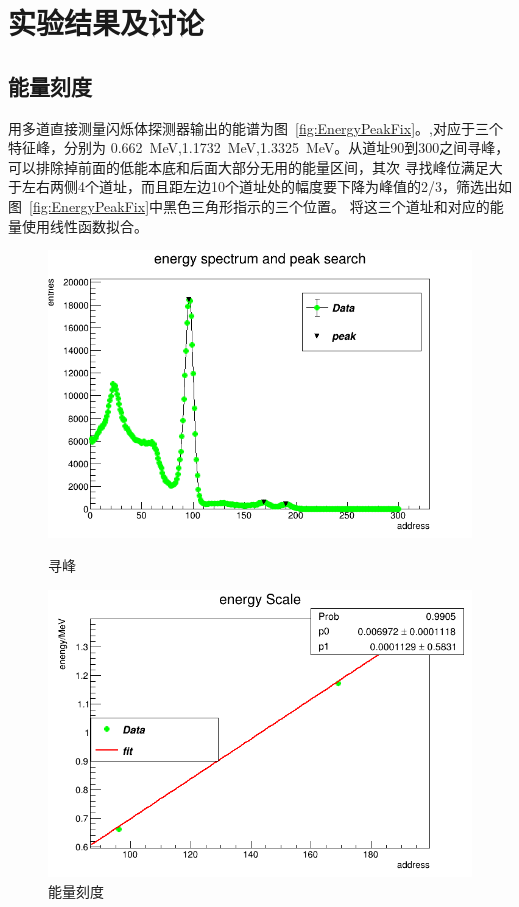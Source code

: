 \documentclass[10pt]{ctexart}
\begin{document}
\section{实验结果及讨论}
\subsection{能量刻度}

用多道直接测量闪烁体探测器输出的能谱为图~\ref{fig:EnergyPeakFix}。,对应于三个特征峰，分别为
\SI{0.662}{MeV},\SI{1.1732}{MeV},\SI{1.3325}{MeV}。从道址90到300之间寻峰，可以排除掉前面的低能本底和后面大部分无用的能量区间，其次
寻找峰位满足大于左右两侧4个道址，而且距左边10个道址处的幅度要下降为峰值的2/3，筛选出如图~\ref{fig:EnergyPeakFix}中黑色三角形指示的三个位置。
将这三个道址和对应的能量使用线性函数拟合。
\begin{figure}[htbp]
    \centering
    \begin{minipage}{0.45\textwidth}
        \centering
        \includegraphics[width=\textwidth]{data/scaleEnergy.png}
        \caption{寻峰}
        \label{fig:EnergyPeakFix}
    \end{minipage}
    \qquad
    \begin{minipage}{0.45\textwidth}
        \centering
        \includegraphics[width=\textwidth]{data/scaleEnergyFit.png}
        \caption{能量刻度}
        \label{fig:EnergyFix}
    \end{minipage}
\end{figure}
\end{document}
